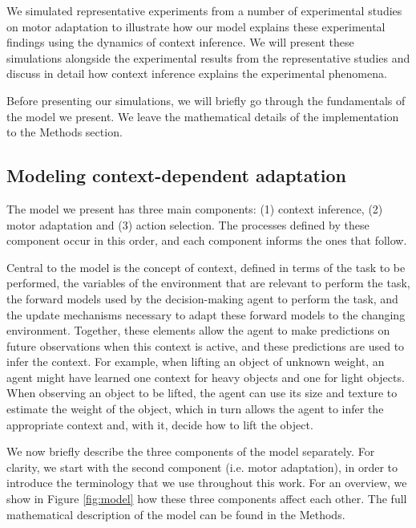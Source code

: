 \documentclass[a4paper,doc,floatsintext,natbib]{apa6}%
\def \fref #1{Figure \ref{#1}}     %
\begin{document}
We simulated representative experiments from a number of experimental studies on motor adaptation to illustrate how our model explains these experimental findings using the dynamics of context inference. We will present these simulations alongside the experimental results from the representative studies and discuss in detail how context inference explains the experimental phenomena.

Before presenting our simulations, we will briefly go through the fundamentals of the model we present. We leave the mathematical details of the implementation to the Methods section.

\subsection{Modeling context-dependent adaptation}
The model we present has three main components: (1) context inference, (2) motor adaptation and (3) action selection. The processes defined by these component occur in this order, and each component informs the ones that follow.

Central to the model is the concept of context, defined in terms of the task to be performed, the variables of the environment that are relevant to perform the task, the forward models used by the decision-making agent to perform the task, and the update mechanisms necessary to adapt these forward models to the changing environment. Together, these elements allow the agent to make predictions on future observations when this context is active, and these predictions are used to infer the context. For example, when lifting an object of unknown weight, an agent might have learned one context for heavy objects and one for light objects. When observing an object to be lifted, the agent can use its size and texture to estimate the weight of the object, which in turn allows the agent to infer the appropriate context and, with it, decide how to lift the object.

We now briefly describe the three components of the model separately. For clarity, we start with the second component (i.e. motor adaptation), in order to introduce the terminology that we use throughout this work. For an overview, we show in \fref{fig:model} how these three components affect each other. The full mathematical description of the model can be found in the Methods.
\end{document}
